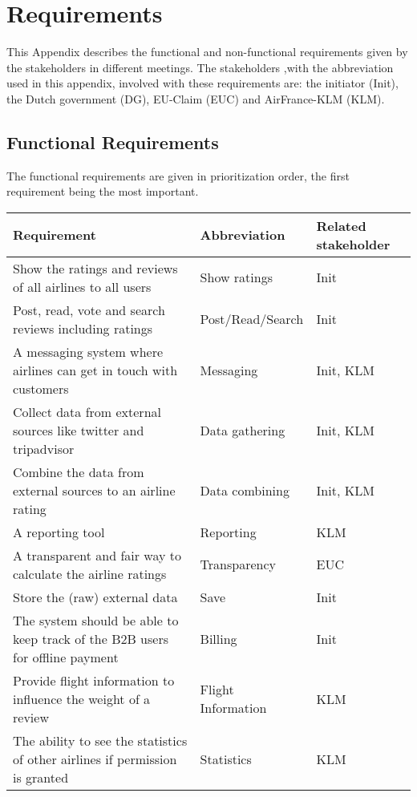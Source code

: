 \section{Requirements}
This Appendix describes the functional and non-functional requirements given by the stakeholders in different meetings. The stakeholders ,with the abbreviation used in this appendix, involved with these requirements are: the initiator (Init), the Dutch government (DG), EU-Claim (EUC) and AirFrance-KLM (KLM). 

\subsection*{Functional Requirements}
The functional requirements are given in prioritization order, the first requirement being the most important. 

\label{requir}
\begin{longtable}{| p{10cm}| l | l |}
\hline
\textbf{Requirement} & \textbf{Abbreviation} & \textbf{Related stakeholder} \\ \hline
Show the ratings and reviews of all airlines to all users & Show ratings & Init \\ \hline
Post, read, vote and search reviews including ratings & Post/Read/Search & Init \\ \hline
A messaging system where airlines can get in touch with customers & Messaging & Init, KLM \\ \hline
Collect data from external sources like twitter and tripadvisor & Data gathering & Init, KLM \\ \hline
Combine the data from external sources to an airline rating & Data combining & Init, KLM \\ \hline
A reporting tool & Reporting & KLM \\ \hline
A transparent and fair way to calculate the airline ratings & Transparency & EUC \\ \hline
Store the (raw) external data & Save & Init \\ \hline
The system should be able to keep track of the B2B users for offline payment & Billing & Init \\ \hline
Provide flight information to influence the weight of a review & Flight Information & KLM \\ \hline
The ability to see the statistics of other airlines if permission is granted & Statistics & KLM \\ \hline 

\end{longtable}

